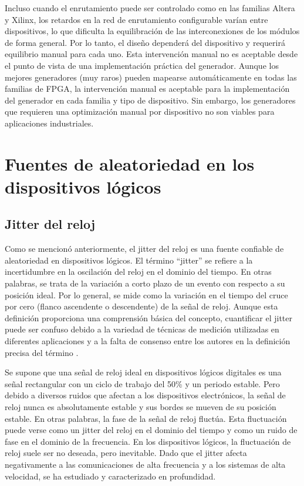             Incluso cuando el enrutamiento puede ser controlado como en las familias Altera y Xilinx, los retardos en la red de enrutamiento configurable varían entre dispositivos, lo que dificulta la equilibración de las interconexiones de los módulos de forma general. Por lo tanto, el diseño dependerá del dispositivo y requerirá equilibrio manual para cada uno. Esta intervención manual no es aceptable desde el punto de vista de una implementación práctica del generador. Aunque los mejores generadores (muy raros) pueden mapearse automáticamente en todas las familias de FPGA, la intervención manual es aceptable para la implementación del generador en cada familia y tipo de dispositivo. Sin embargo, los generadores que requieren una optimización manual por dispositivo no son viables para aplicaciones industriales.


\section{Fuentes de aleatoriedad en los dispositivos lógicos}

        \subsection{Jitter del reloj}

            Como se mencionó anteriormente, el jitter del reloj es una fuente confiable de aleatoriedad en dispositivos lógicos. El término ``jitter'' se refiere a la incertidumbre en la oscilación del reloj en el dominio del tiempo. En otras palabras, se trata de la variación a corto plazo de un evento con respecto a su posición ideal. Por lo general, se mide como la variación en el tiempo del cruce por cero (flanco ascendente o descendente) de la señal de reloj. Aunque esta definición proporciona una comprensión básica del concepto, cuantificar el jitter puede ser confuso debido a la variedad de técnicas de medición utilizadas en diferentes aplicaciones y a la falta de consenso entre los autores en la definición precisa del término \cite{Valtchanov2008}.

            Se supone que una señal de reloj ideal en dispositivos lógicos digitales es una señal rectangular con un ciclo de trabajo del 50\% y un periodo estable. Pero debido a diversos ruidos que afectan a los dispositivos electrónicos, la señal de reloj nunca es absolutamente estable y sus bordes se mueven de su posición estable. En otras palabras, la fase de la señal de reloj fluctúa. Esta fluctuación puede verse como un jitter del reloj en el dominio del tiempo y como un ruido de fase en el dominio de la frecuencia. En los dispositivos lógicos, la fluctuación de reloj suele ser no deseada, pero inevitable. Dado que el jitter afecta negativamente a las comunicaciones de alta frecuencia y a los sistemas de alta velocidad, se ha estudiado y caracterizado en profundidad.

